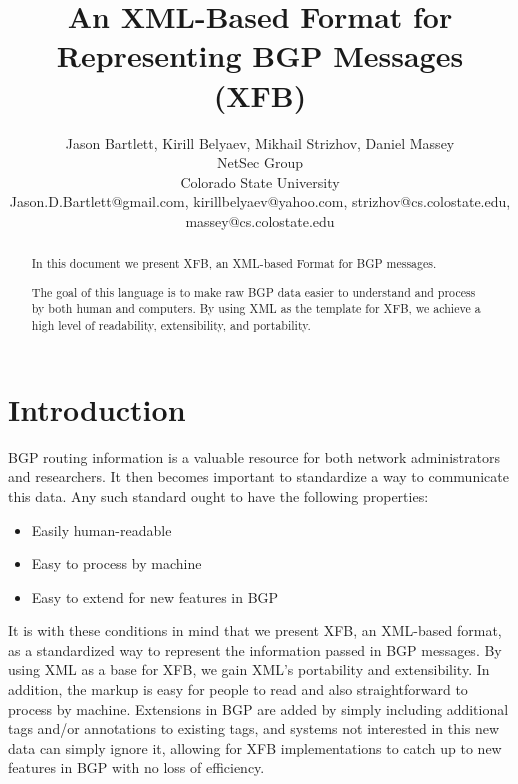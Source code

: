 \documentclass{article}
\begin{document}
\title{An XML-Based Format for Representing BGP Messages (XFB)}
\author{Jason Bartlett, Kirill Belyaev, Mikhail Strizhov, Daniel Massey\\
NetSec Group\\
Colorado State University\\
Jason.D.Bartlett@gmail.com, kirillbelyaev@yahoo.com, strizhov@cs.colostate.edu, massey@cs.colostate.edu}

\maketitle
\tableofcontents

\begin{abstract}
In this document we present XFB, an XML-based Format for BGP messages.

The goal of this language is to make raw BGP data easier to understand and process by both human and computers.  By using XML as the template for XFB, we achieve a high level of readability, extensibility, and portability.
\end{abstract}

\section{Introduction}
\label{INTRO}
BGP routing information is a valuable resource for both network administrators and researchers.  It then becomes important to standardize a way to communicate this data.  Any such standard ought to have the following properties:

\begin{itemize}
\item{Easily human-readable}
\item{Easy to process by machine}
\item{Easy to extend for new features in BGP}
\end{itemize}

It is with these conditions in mind that we present XFB, an XML-based format, as a standardized way to represent the information passed in BGP messages.  By using XML as a base for XFB, we gain XML's portability and extensibility.  In addition, the markup is easy for people to read and also straightforward to process by machine.  Extensions in BGP are added by simply including additional tags and/or annotations to existing tags, and systems not interested in this new data can simply ignore it, allowing for XFB implementations to catch up to new features in BGP with no loss of efficiency.
\end{document}

